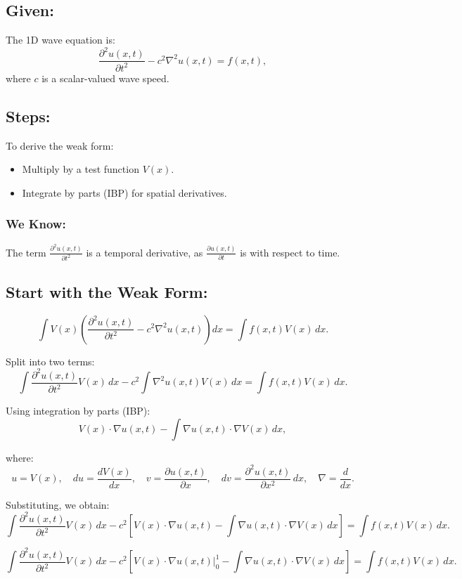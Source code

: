 \documentclass[11pt]{article}
\begin{document}
\subsection*{Given:}
The 1D wave equation is:
\[
\frac{\partial^2 u(x, t)}{\partial t^2} - c^2 \nabla^2 u(x, t) = f(x, t),
\]
where \(c\) is a scalar-valued wave speed.

\subsection*{Steps:}
To derive the weak form:
\begin{itemize}
    \item Multiply by a test function \(V(x)\).
    \item Integrate by parts (IBP) for spatial derivatives.
\end{itemize}

\subsubsection*{We Know:}
The term \(\frac{\partial^2 u(x, t)}{\partial t^2}\) is a temporal derivative, as \(\frac{\partial u(x, t)}{\partial t}\) is with respect to time.

\subsection*{Start with the Weak Form:}
\[
\int V(x) \left( \frac{\partial^2 u(x, t)}{\partial t^2} - c^2 \nabla^2 u(x, t) \right) dx = \int f(x, t) V(x) \, dx.
\]

Split into two terms:
\[
\int \frac{\partial^2 u(x, t)}{\partial t^2} V(x) \, dx - c^2 \int \nabla^2 u(x, t) V(x) \, dx = \int f(x, t) V(x) \, dx.
\]

Using integration by parts (IBP):
\[
V(x) \cdot \nabla u(x, t) - \int \nabla u(x, t) \cdot \nabla V(x) \, dx,
\]

where:
\[
u = V(x), \quad du = \frac{dV(x)}{dx}, \quad v = \frac{\partial u(x, t)}{\partial x}, \quad dv = \frac{\partial^2 u(x, t)}{\partial x^2} \, dx, \quad \nabla = \frac{d}{dx}.
\]

Substituting, we obtain:
\[
\int \frac{\partial^2 u(x, t)}{\partial t^2} V(x) \, dx - c^2 \left[ V(x) \cdot \nabla u(x, t) - \int \nabla u(x, t) \cdot \nabla V(x) \, dx \right] = \int f(x, t) V(x) \, dx.
\]

\[
\boxed{
\int \frac{\partial^2 u(x, t)}{\partial t^2} V(x) \, dx - c^2 \left[ V(x) \cdot \nabla u(x, t) \big|_{0}^{1} - \int \nabla u(x, t) \cdot \nabla V(x) \, dx \right] = \int f(x, t) V(x) \, dx
}.
\]
\end{document}
